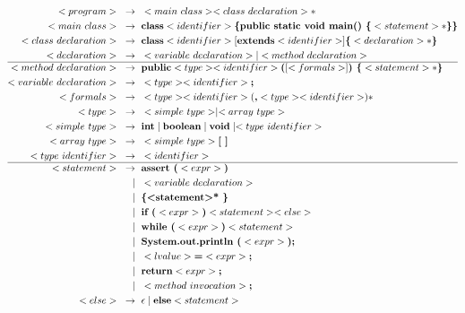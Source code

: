 \documentclass[a4paper,12pt]{article}
\newcommand{\bb}[1]{\textbf{#1}}
\newcommand{\s}{\text{ }}
\newcommand{\bracel}{\textbraceleft}
\newcommand{\bracer}{\textbraceright}
\begin{document}
\begin{align*}
<program>\s \to \s &<main\s class> <class\s declaration>* \\
<main\s class>\s \to \s &\bb{class} <identifier> \bb{\bracel public static void main() \bracel} <statement>* \bb{\bracer \bracer}\\
<class\s declaration>\s \to \s &\bb{class} <identifier> [\bb{extends} <identifier>] \bb{\bracel}<declaration>* \bb{\bracer}\\
<declaration>\s \to \s &<variable\s declaration> | <method\s declaration> \\ 
\hline
<method\s declaration>\s \to \s &\bb{public} <type> <identifier> \bb{(} [ <formals> ] \bb{) \bracel} <statement>* \bb{\bracer}\\
<variable\s declaration>\s \to \s &<type> <identifier> \bb{;}\\
<formals>\s \to \s &<type> <identifier> ( \bb{,} <type> <identifier> )*\\
<type>\s \to \s &<simple\s type> \mid <array\s type>\\
<simple\s type>\s \to \s &\bb{int} \mid \bb{boolean} \mid \bb{void} \mid <type\s identifier>\\
<array\s type>\s \to \s &<simple\s type> \bb{[ ]}\\
<type\s identifier>\s \to \s &<identifier> \\
\hline
<statement>\s \to \s &\bb{assert (} <expr> \bb{)}  \\
             \mid \s &<variable\s declaration>  \\
             \mid \s &\bb{\bracel <statement>* \bracer}  \\
             \mid \s &\bb{if (} <expr> \bb{)} <statement> <else> \\
             \mid \s &\bb{while (} <expr> \bb{)} <statement>  \\
             \mid \s &\bb{System.out.println (} <expr> \bb{);}  \\
             \mid \s &<lvalue> \bb{=} <expr> \bb{;}  \\
             \mid \s &\bb{return} <expr> \bb{;}  \\
             \mid \s &<method\s invocation> \bb{;} \\
<else>\s \to \s &\epsilon \mid \bb{else} <statement> \\

\end{align*}
\end{document}
